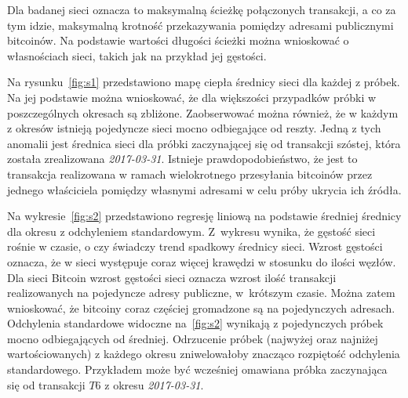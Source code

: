 \documentclass[12pt, oneside, final, openany]{mgr}
\begin{document}
\indent Dla badanej sieci oznacza to maksymalną ścieżkę połączonych transakcji, a co za tym idzie, maksymalną krotność przekazywania pomiędzy adresami publicznymi bitcoinów. Na podstawie wartości długości ścieżki można wnioskować o własnościach sieci, takich jak na przykład jej gęstości.

\indent Na rysunku~\ref{fig:s1} przedstawiono mapę ciepła średnicy sieci dla każdej z próbek. Na jej podstawie można wnioskować, że dla większości przypadków próbki w poszczególnych okresach są zbliżone. Zaobserwować można również, że w każdym z okresów istnieją pojedyncze sieci mocno odbiegające od reszty. Jedną z tych anomalii jest średnica sieci dla próbki zaczynającej się od transakcji szóstej, która została zrealizowana \textit{2017-03-31}. Istnieje prawdopodobieństwo, że jest to transakcja realizowana w ramach wielokrotnego przesyłania bitcoinów przez jednego właściciela pomiędzy własnymi adresami w celu próby ukrycia ich źródła.

\indent Na wykresie~\ref{fig:s2} przedstawiono regresję liniową na podstawie średniej średnicy dla okresu z odchyleniem standardowym. Z~wykresu wynika, że gęstość sieci rośnie w czasie, o czy świadczy trend spadkowy średnicy sieci. Wzrost gęstości oznacza, że w sieci występuje coraz więcej krawędzi w stosunku do ilości węzłów. Dla sieci Bitcoin wzrost gęstości sieci oznacza wzrost ilość transakcji realizowanych na pojedyncze adresy publiczne, w~krótszym czasie. Można zatem wnioskować, że bitcoiny coraz częściej gromadzone są na pojedynczych adresach. Odchylenia standardowe widoczne na~\ref{fig:s2} wynikają z pojedynczych próbek mocno odbiegających od średniej. Odrzucenie próbek (najwyżej oraz najniżej wartościowanych) z każdego okresu zniwelowałoby znacząco rozpiętość odchylenia standardowego. Przykładem może być wcześniej omawiana próbka zaczynająca się od transakcji $T6$ z okresu \textit{2017-03-31}. 
\end{document}

